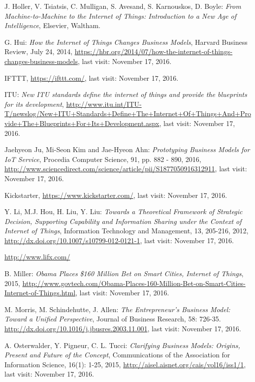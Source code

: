 \begin{thebibliography}{99}
	 J. Holler, V. Tsiatsis, C. Mulligan, S. Avesand, S. Karnouskos, D. Boyle: \emph{From Machine-to-Machine to the Internet of Things: Introduction to a New Age of Intelligence}, Elsevier, Waltham.
	
	 G. Hui: \emph{How the Internet of Things Changes Business Models}, Harvard Business Review, July 24, 2014, \url{https://hbr.org/2014/07/how-the-internet-of-things-changes-business-models}, last visit: November 17, 2016.

 	 IFTTT, \url{https://ifttt.com/}, last visit: November 17, 2016.

 	 ITU: \emph{New ITU standards define the internet of things and provide the blueprints for its development}, \url{http://www.itu.int/ITU-T/newslog/New+ITU+Standards+Define+The+Internet+Of+Things+And+Provide+The+Blueprints+For+Its+Development.aspx}, last visit: November 17, 2016.

 	 Jaehyeon Ju, Mi-Seon Kim and Jae-Hyeon Ahn: \emph{Prototyping Business Models for IoT Service}, Procedia Computer Science, 91, pp. 882 - 890, 2016, \url{http://www.sciencedirect.com/science/article/pii/S1877050916312911}, last visit: November 17, 2016.
 	
 	 Kickstarter, \url{https://www.kickstarter.com/}, last visit: November 17, 2016.

	 Y. Li, M.J. Hou, H. Liu, Y. Liu: \emph{Towards a Theoretical Framework of Strategic Decision, Supporting Capability and Information Sharing under the Context of Internet of Things}, Information Technology and Management, 13, 205-216, 2012, \url{http://dx.doi.org/10.1007/s10799-012-0121-1}, last visit: November 17, 2016.

  	 \url{http://www.lifx.com/}

	 B. Miller: \emph{Obama Places \$160 Million Bet on Smart Cities, Internet of Things}, 2015, \url{http://www.govtech.com/Obama-Places-160-Million-Bet-on-Smart-Cities-Internet-of-Things.html}, last visit: November 17, 2016.

	 M. Morris, M. Schindehutte, J. Allen: \emph{The Entrepreneur's Business Model: Toward a Unified Perspective}, Journal of Business Research, 58: 726-35. \url{http://dx.doi.org/10.1016/j.jbusres.2003.11.001}, last visit: November 17, 2016.

	 A. Osterwalder, Y. Pigneur, C. L. Tucci: \emph{Clarifying Business Models: Origins, Present and Future of the Concept}, Communications of the Association for Information Science, 16(1): 1-25, 2015, \url{http://aisel.aisnet.org/cais/vol16/iss1/1}, last visit: November 17, 2016.


\end{thebibliography}
